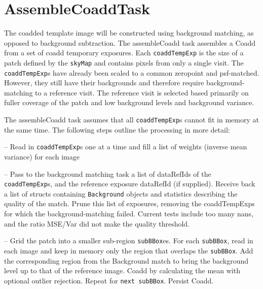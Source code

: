 \documentclass[12pt]{article}
\begin{document}
\section{AssembleCoaddTask} 

The coadded template image will be constructed using background
matching, as opposed to background subtraction. The assembleCoadd task assembles a Coadd from a set of coadd temporary exposures.   Each {\tt coaddTempExp} is the size of a patch defined by the {\tt skyMap} and contains pixels from only a single visit.  The {\tt coaddTempExp}s have already been scaled to a common zeropoint and psf-matched.  However, they still have their backgrounds and therefore require background-matching to a reference visit. The reference visit is selected based primarily on fuller coverage of the patch and low background levels and background variance. 

The assembleCoadd task assumes that all {\tt coaddTempExp}s cannot fit in memory at the same time. The following steps outline the processing in more detail:

-- Read in {\tt coaddTempExp}s one at a time and fill a list of weights (inverse mean variance) for each image 

-- Pass to the background matching task a list of dataRefIds of the {\tt coaddTempExp}s, and the reference exposure dataRefId (if supplied).  Receive back a list of structs containing {\tt Background} objects and statistics describing the quality of the match.  Prune this list of exposures, removing the coaddTempExps for which the background-matching failed.  Current tests include too many nans, and the ratio MSE/Var did not make the quality threshold.

-- Grid the patch into a smaller sub-region {\tt subBBox}es. For each {\tt subBBox}, read in each image and keep in memory only the region that overlaps the {\tt subBBox}. Add the corresponding region from the Background match to bring the background level up to that of the reference image.  Coadd by calculating the mean with optional outlier rejection.  Repeat for {\tt next subBBox}.  Persist Coadd. 


\end{document}
